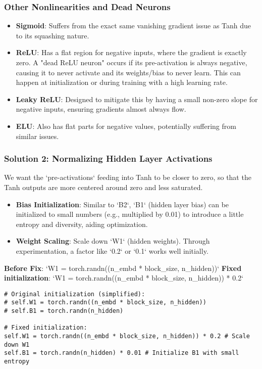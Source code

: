 \subsubsection{Other Nonlinearities and Dead Neurons}
\begin{itemize}
    \item \textbf{Sigmoid}: Suffers from the exact same vanishing gradient issue as Tanh due to its squashing nature.
    \item \textbf{ReLU}: Has a flat region for negative inputs, where the gradient is exactly zero. A "dead ReLU neuron" occurs if its pre-activation is always negative, causing it to never activate and its weights/bias to never learn. This can happen at initialization or during training with a high learning rate.
    \item \textbf{Leaky ReLU}: Designed to mitigate this by having a small non-zero slope for negative inputs, ensuring gradients almost always flow.
    \item \textbf{ELU}: Also has flat parts for negative values, potentially suffering from similar issues.
\end{itemize}

\subsubsection{Solution 2: Normalizing Hidden Layer Activations}
We want the `pre-activations` feeding into Tanh to be closer to zero, so that the Tanh outputs are more centered around zero and less saturated.
\begin{itemize}
    \item \textbf{Bias Initialization}: Similar to `B2`, `B1` (hidden layer bias) can be initialized to small numbers (e.g., multiplied by 0.01) to introduce a little entropy and diversity, aiding optimization.
    \item \textbf{Weight Scaling}: Scale down `W1` (hidden weights). Through experimentation, a factor like `0.2` or `0.1` works well initially.
\end{itemize}

\textbf{Before Fix}: `W1 = torch.randn((n_embd * block_size, n_hidden))`
\textbf{Fixed initialization}: `W1 = torch.randn((n_embd * block_size, n_hidden)) * 0.2`

\begin{lstlisting}
# Original initialization (simplified):
# self.W1 = torch.randn((n_embd * block_size, n_hidden))
# self.B1 = torch.randn(n_hidden)

# Fixed initialization:
self.W1 = torch.randn((n_embd * block_size, n_hidden)) * 0.2 # Scale down W1
self.B1 = torch.randn(n_hidden) * 0.01 # Initialize B1 with small entropy
\end{lstlisting}

